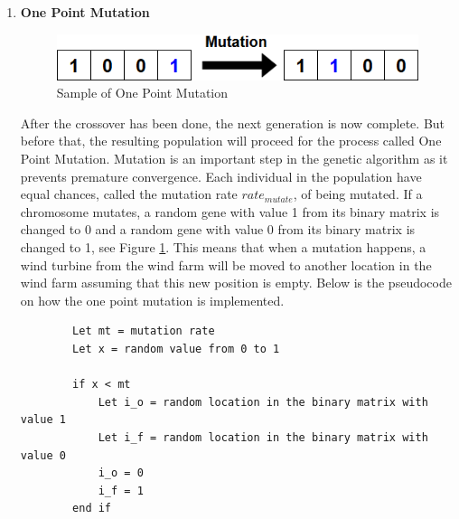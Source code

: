 \begin{enumerate}
\begin{lstlisting}
        Let i = 1
        while i is less than or equal size of Pgenes1 or Pgenes2
            if ith element of mask is 1
                ith element of Ogenes1 = ith element of Pgenes2
                ith element of Ogenes2 = ith element of Pgenes1
            else
                ith element of Ogenes1 = ith element of Pgenes1
                ith element of Ogenes2 = ith element of Pgenes2
            end else-if
            i = i+1 // Moves to the next position on the lists
        end while
        \end{lstlisting}
        \doublespacing
                    
                \item \textbf{One Point Mutation}
                    \begin{figure}[h]
                        \centering
                        \includegraphics[width=130mm]{Figures/mutation.png}
                        \caption{Sample of One Point Mutation}
                        \label{mutate}
                    \end{figure}
                    \par After the crossover has been done, the next generation is now complete. But before that, the resulting population will proceed for the process called One Point Mutation. Mutation is an important step in the genetic algorithm as it prevents premature convergence. Each individual in the population have equal chances, called the mutation rate $rate_{mutate}$, of being mutated. If a chromosome mutates, a random gene with value 1 from its binary matrix is changed to 0 and a random gene with value 0 from its binary matrix is changed to 1, see Figure \ref{mutate}. This means that when a mutation happens, a wind turbine from the wind farm will be moved to another location in the wind farm assuming that this new position is empty. Below is the pseudocode on how the one point mutation is implemented.
                    
        \singlespacing
        \begin{lstlisting}
        Let mt = mutation rate
        Let x = random value from 0 to 1
        
        if x < mt
            Let i_o = random location in the binary matrix with value 1
            Let i_f = random location in the binary matrix with value 0
            i_o = 0
            i_f = 1
        end if
        \end{lstlisting}
        \doublespacing
                    

\end{enumerate}
